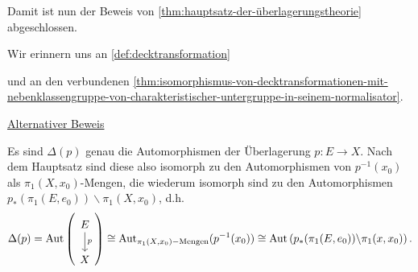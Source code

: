Damit ist nun der Beweis von \autoref{thm:hauptsatz-der-überlagerungstheorie} abgeschlossen.

Wir erinnern uns an \autoref{def:decktransformation} 


und an den verbundenen \autoref{thm:isomorphismus-von-decktransformationen-mit-nebenklassengruppe-von-charakteristischer-untergruppe-in-seinem-normalisator}.



\underline{Alternativer Beweis}

Es sind $\Delta(p)$ genau die Automorphismen der Überlagerung  $p\colon  E \to X$. Nach dem Hauptsatz sind diese also isomorph zu den Automorphismen von $p^{-1} (x_0)$ als $\pi_1(X,x_0)$-Mengen, die wiederum isomorph sind zu den Automorphismen $p_*(\pi_1(E,e_0)) \backslash \pi_1(X,x_0)$, d.h.
\[
    \Delta(p) = \Aut \left(
    \begin{tikzcd}
        E \ar{d}{p} \\ X
    \end{tikzcd}\right) 
    \cong \Aut_{\pi_1(X,x_0)-\text{Mengen}} (p^{-1} (x_0)) \cong \Aut \left( p_*(\pi_1(E,e_0)) \backslash \pi_1(x,x_0) \right) 
.\] 

